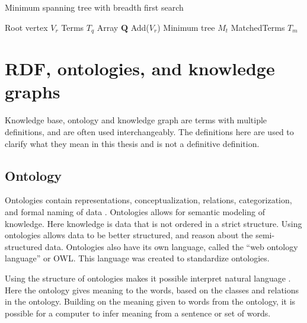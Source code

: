 \begin{algorithm}
    \caption{Minimum spanning tree with breadth first search}
    \label{MinTreeBFS}
    \SetAlgoLined
    Root vertex $V_r$\; Terms $T_q$\; Array $\mathbf{Q}$ Add($V_r$)\; Minimum tree $M_t$\; MatchedTerms $T_m$\;
\end{algorithm}

\section{RDF, ontologies, and knowledge graphs}
Knowledge base, ontology and knowledge graph are terms with multiple definitions, and are often used interchangeably. The definitions here are used to clarify what they mean in this thesis and is not a definitive definition.

\subsection{Ontology}
Ontologies contain representations, conceptualization, relations, categorization, and formal naming of data \cite{davies2006semantic}. Ontologies allows for semantic modeling of knowledge. Here knowledge is data that is not ordered in a strict structure. Using ontologies allows data to be better structured, and reason about the semi-structured data. Ontologies also have its own language, called the ``web ontology language'' or OWL. This language was created to standardize ontologies.

Using the structure of ontologies makes it possible interpret natural language \cite{cimiano2014ontology}. Here the ontology gives meaning to the words, based on the classes and relations in the ontology. Building on the meaning given to words from the ontology, it is possible for a computer to infer meaning from a sentence or set of words.

